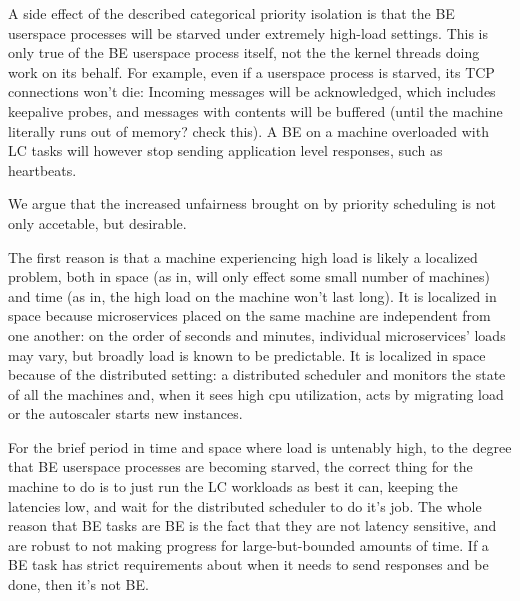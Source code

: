 A side effect of the described categorical priority isolation is that the BE
userspace processes will be starved under extremely high-load settings. This is
only true of the BE userspace process itself, not the the kernel threads doing
work on its behalf. For example, even if a userspace process is starved, its TCP
connections won't die: Incoming messages will be acknowledged, which includes
keepalive probes, and messages with contents will be buffered (until the machine
literally runs out of memory? check this). A BE on a machine overloaded with LC
tasks will however stop sending application level responses, such as heartbeats. 

We argue that the increased unfairness brought on by priority scheduling is not
only accetable, but desirable.

The first reason is that a machine experiencing high load is likely a localized
problem, both in space (as in, will only effect some small number of machines)
and time (as in, the high load on the machine won't last long). It is localized
in space because microservices placed on the same machine are independent from
one another: on the order of seconds and minutes, individual microservices'
loads may vary, but broadly load is known to be predictable. It is localized in
space because of the distributed setting: a distributed scheduler and monitors
the state of all the machines and, when it sees high cpu utilization, acts by
migrating load or the autoscaler starts new instances.

For the brief period in time and space where load is untenably high, to the
degree that BE userspace processes are becoming starved, the correct thing for
the machine to do is to just run the LC workloads as best it can, keeping the
latencies low, and wait for the distributed scheduler to do it's job. The whole
reason that BE tasks are BE is the fact that they are not latency sensitive, and
are robust to not making progress for large-but-bounded amounts of time. If a BE
task has strict requirements about when it needs to send responses and be done,
then it's not BE.